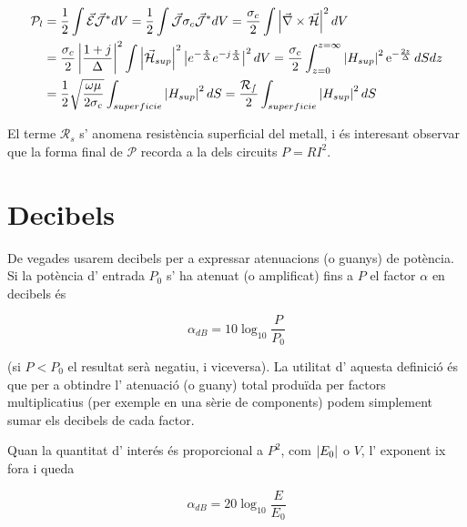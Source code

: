 \begin{align}
  \mathcal P _l &= \frac{1}{2} \int \vec{\mathcal{E}} \vec{\mathcal{J}} ^* dV = \frac{1}{2} \int \vec{\mathcal{J}} \sigma _c \vec{\mathcal{J}}^* dV = \frac{\sigma _c }{2} \int \left \vert \vec \nabla \times \vec{\mathcal{H}} \right \vert ^2 dV \\
  &= \frac{\sigma _c}{2} \left \vert \frac{1 + j}{\Delta} \right \vert ^2 \int \left \vert \vec{\mathcal{H}} _{sup} \right \vert ^2 \left \vert e ^{- \frac{z}{\Delta}} e ^{-j \frac{z}{\Delta}} \right \vert ^2 dV = \frac{\sigma_c}{2} \int _{z = 0} ^ {z = \infty} \left \vert H_{sup} \right \vert ^2 \operatorname{e}^{-\frac{2z}{\Delta}} dS dz \nonumber \\
 &= \frac{1}{2} \sqrt{\frac{\omega \mu}{2\sigma _c}} \int _{superficie} \left \vert H_{sup} \right \vert ^2 dS= \frac{\mathcal {R _s}}{2} \int _{superficie} \left \vert H_{sup} \right \vert ^2 dS \nonumber 
\end{align}

El terme $\mathcal R_s$ s' anomena resistència superficial del metall, i és interesant observar que la forma final de $\mathcal P$ recorda a la dels circuits $P = R I ^2$.

\section{Decibels}

De vegades usarem decibels per a expressar atenuacions (o guanys) de potència. Si la potència d' entrada $P_0$ s' ha atenuat (o amplificat) fins a $P$ el factor $\alpha$ en decibels és

\begin{equation}
  \alpha_{dB} = 10 \log_{10} \frac{P}{P_0}
\end{equation}

(si $P < P_0$ el resultat serà negatiu, i viceversa). La utilitat d' aquesta definició és que per a obtindre l' atenuació (o guany) total produïda per factors multiplicatius (per exemple en una sèrie de components) podem simplement sumar els decibels de cada factor.

Quan la quantitat d' interés és proporcional a $P^2$, com $\left\rvert E_0 \right\lvert$ o $V$, l' exponent ix fora i queda 

\begin{equation}
  \alpha_{dB} = 20 \log_{10} \frac{E}{E_0}
\end{equation}